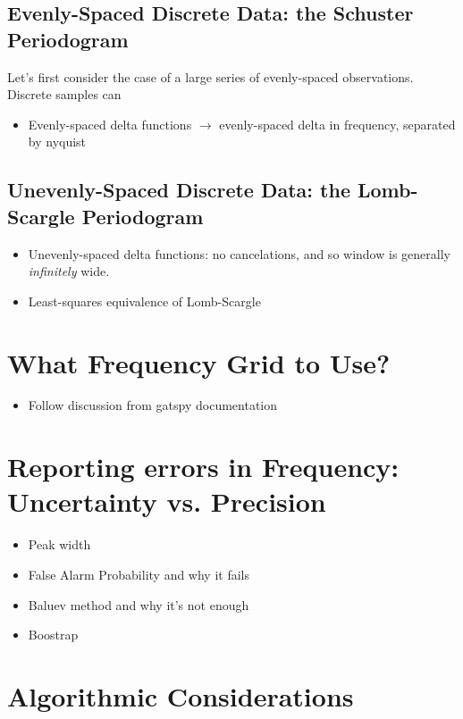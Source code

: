 \documentclass[preprint]{aastex}
\begin{document}
\subsection{Evenly-Spaced Discrete Data: the Schuster Periodogram}

Let's first consider the case of a large series of evenly-spaced observations.
Discrete samples can


\begin{itemize}
\item Evenly-spaced delta functions $\to$ evenly-spaced delta in frequency, separated by nyquist
\end{itemize}

\subsection{Unevenly-Spaced Discrete Data: the Lomb-Scargle Periodogram}


\begin{itemize}
\item Unevenly-spaced delta functions: no cancelations, and so window is generally {\it infinitely} wide.
\item Least-squares equivalence of Lomb-Scargle
\end{itemize}

\section{What Frequency Grid to Use?}

\begin{itemize}
\item Follow discussion from gatspy documentation
\end{itemize}

\section{Reporting errors in Frequency: Uncertainty vs. Precision}

\begin{itemize}
\item Peak width
\item False Alarm Probability and why it fails
\item Baluev method and why it's not enough
\item Boostrap
\end{itemize}

\section{Algorithmic Considerations}
\end{document}
